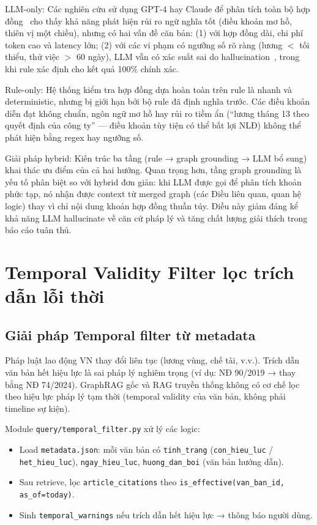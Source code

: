 \documentclass[../DoAn.tex]{subfiles}
\begin{document}
LLM-only: Các nghiên cứu sử dụng GPT-4 hay Claude để phân tích toàn bộ hợp đồng~\cite{hendrycks2021cuad,manor2019clause} cho thấy khả năng phát hiện rủi ro ngữ nghĩa tốt (điều khoản mơ hồ, thiên vị một chiều), nhưng có hai vấn đề căn bản: (1) với hợp đồng dài, chi phí token cao và latency lớn; (2) với các vi phạm có ngưỡng số rõ ràng (lương $<$ tối thiểu, thử việc $>$ 60 ngày), LLM vẫn có xác suất sai do hallucination~\cite{ji2023hallucination}, trong khi rule xác định cho kết quả 100\% chính xác.

Rule-only: Hệ thống kiểm tra hợp đồng dựa hoàn toàn trên rule là nhanh và deterministic, nhưng bị giới hạn bởi bộ rule đã định nghĩa trước. Các điều khoản diễn đạt không chuẩn, ngôn ngữ mơ hồ hay rủi ro tiềm ẩn (``lương tháng 13 theo quyết định của công ty'' --- điều khoản tùy tiện có thể bất lợi NLĐ) không thể phát hiện bằng regex hay ngưỡng số.

Giải pháp hybrid: Kiến trúc ba tầng (rule → graph grounding → LLM bổ sung) khai thác ưu điểm của cả hai hướng. Quan trọng hơn, tầng graph grounding là yếu tố phân biệt so với hybrid đơn giản: khi LLM được gọi để phân tích khoản phức tạp, nó nhận được context từ merged graph (các Điều liên quan, quan hệ logic) thay vì chỉ nội dung khoản hợp đồng thuần túy. Điều này giảm đáng kể khả năng LLM hallucinate về căn cứ pháp lý và tăng chất lượng giải thích trong báo cáo tuân thủ.

\section{Temporal Validity Filter lọc trích dẫn lỗi thời}
\label{section:5.4}

\subsection{Giải pháp Temporal filter từ metadata}
\label{subsection:5.4.2}

Pháp luật lao động VN thay đổi liên tục (lương vùng, chế tài, v.v.). Trích dẫn văn bản hết hiệu lực là sai pháp lý nghiêm trọng (ví dụ: NĐ 90/2019 → thay bằng NĐ 74/2024). GraphRAG gốc và RAG truyền thống không có cơ chế lọc theo hiệu lực pháp lý tạm thời (temporal validity của văn bản, không phải timeline sự kiện).

Module \texttt{query/temporal\_filter.py} xử lý các logic:

\begin{itemize}[nosep, leftmargin=*]
    \item Load \texttt{metadata.json}: mỗi văn bản có \texttt{tinh\_trang} (\texttt{con\_hieu\_luc} / \texttt{het\_hieu\_luc}), \texttt{ngay\_hieu\_luc}, \texttt{huong\_dan\_boi} (văn bản hướng dẫn).
    
    \item Sau retrieve, lọc \texttt{article\_citations} theo \texttt{is\_effective(van\_ban\_id, as\_of=today)}.
    
    \item Sinh \texttt{temporal\_warnings} nếu trích dẫn hết hiệu lực → thông báo người dùng.
\end{itemize}
\end{document}
